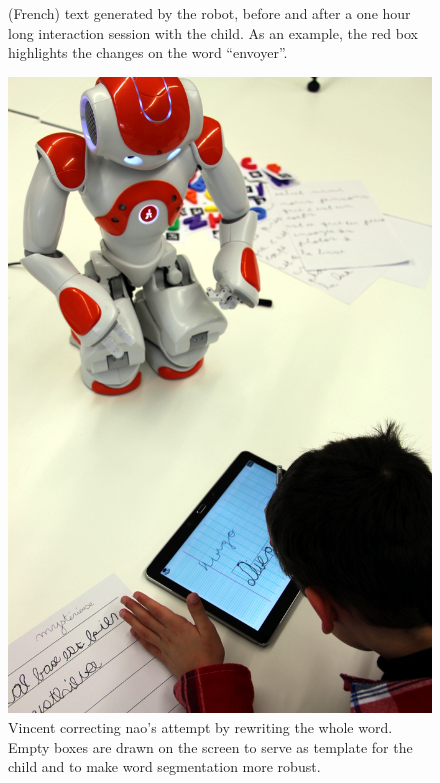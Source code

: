 \documentclass{sig-alternate}
\begin{document}
\begin{figure}
    \centering

    \caption{\small (French) text generated by the robot, before and after a one
        hour long interaction session with the child. As an example, the red box
        highlights the changes on the word ``envoyer''.}

    \label{fig:stimuli}
\end{figure}

\begin{figure}
    \centering
    \includegraphics[width=0.5\linewidth]{diego}
    \caption{\small Vincent correcting {\sc nao}'s attempt by rewriting the
        whole word. Empty boxes are drawn on the screen to serve as template for the child
        and to make word segmentation more robust.}
    \label{fig:Vincent}
\end{figure}
\end{document}
